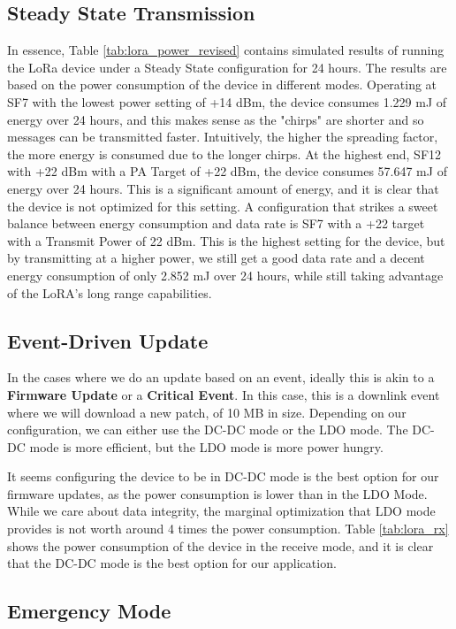 \subsection{Steady State Transmission}
In essence, Table \ref{tab:lora_power_revised} contains simulated results of running the LoRa device under a Steady State configuration for 24 hours. The results are based on the power consumption of the device in different modes. Operating at SF7 with the lowest power setting of +14 dBm, the device consumes 1.229 mJ of energy over 24 hours, and this makes sense as the "chirps" are shorter and so messages can be transmitted faster. Intuitively, the higher the spreading factor, the more energy is consumed due to the longer chirps. At the highest end, SF12 with +22 dBm with a PA Target of +22 dBm, the device consumes 57.647 mJ of energy over 24 hours. This is a significant amount of energy, and it is clear that the device is not optimized for this setting. A configuration that strikes a sweet balance between energy consumption and data rate is SF7 with a +22 target with a Transmit Power of 22 dBm. This is the highest setting for the device, but by transmitting at a higher power, we still get a good data rate and a decent energy consumption of only 2.852 mJ over 24 hours, while still taking advantage of the LoRA's long range capabilities.

\subsection{Event-Driven Update}
In the cases where we do an update based on an event, ideally this is akin to a \textbf{Firmware Update} or a \textbf{Critical Event}. In this case, this is a downlink event where we will download a new patch, of 10 MB in size. Depending on our configuration, we can either use the DC-DC mode or the LDO mode. The DC-DC mode is more efficient, but the LDO mode is more power hungry.


It seems configuring the device to be in DC-DC mode is the best option for our firmware updates, as the power consumption is lower than in the LDO Mode. While we care about data integrity, the marginal optimization that LDO mode provides is not worth around 4 times the power consumption. Table \ref{tab:lora_rx} shows the power consumption of the device in the receive mode, and it is clear that the DC-DC mode is the best option for our application.

\subsection{Emergency Mode}

